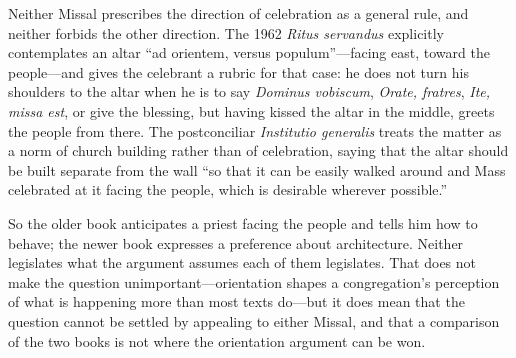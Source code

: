 Neither Missal prescribes the direction of celebration as a general rule, and neither forbids the other direction. The 1962 \emph{Ritus servandus} explicitly contemplates an altar ``ad orientem, versus populum''---facing east, toward the people---and gives the celebrant a rubric for that case: he does not turn his shoulders to the altar when he is to say \emph{Dominus vobiscum}, \emph{Orate, fratres}, \emph{Ite, missa est}, or give the blessing, but having kissed the altar in the middle, greets the people from there. The postconciliar \emph{Institutio generalis} treats the matter as a norm of church building rather than of celebration, saying that the altar should be built separate from the wall ``so that it can be easily walked around and Mass celebrated at it facing the people, which is desirable wherever possible.''

So the older book anticipates a priest facing the people and tells him how to behave; the newer book expresses a preference about architecture. Neither legislates what the argument assumes each of them legislates. That does not make the question unimportant---orientation shapes a congregation's perception of what is happening more than most texts do---but it does mean that the question cannot be settled by appealing to either Missal, and that a comparison of the two books is not where the orientation argument can be won.

